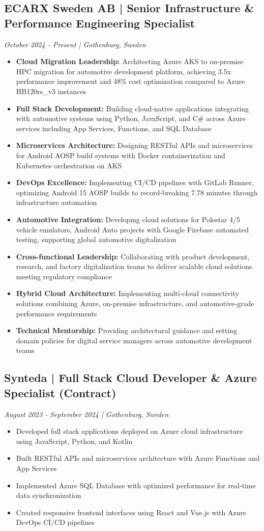 \documentclass[11pt,a4paper]{article}
\begin{document}
\subsection*{ECARX Sweden AB | Senior Infrastructure \& Performance Engineering Specialist}
\textit{October 2024 - Present | Gothenburg, Sweden}
\begin{itemize}[noitemsep]
\item \textbf{Cloud Migration Leadership:} Architecting Azure AKS to on-premise HPC migration for automotive development platform, achieving 3.5x performance improvement and 48\% cost optimization compared to Azure HB120rs\_v3 instances
\item \textbf{Full Stack Development:} Building cloud-native applications integrating with automotive systems using Python, JavaScript, and C\# across Azure services including App Services, Functions, and SQL Database
\item \textbf{Microservices Architecture:} Designing RESTful APIs and microservices for Android AOSP build systems with Docker containerization and Kubernetes orchestration on AKS
\item \textbf{DevOps Excellence:} Implementing CI/CD pipelines with GitLab Runner, optimizing Android 15 AOSP builds to record-breaking 7.78 minutes through infrastructure automation
\item \textbf{Automotive Integration:} Developing cloud solutions for Polestar 4/5 vehicle emulators, Android Auto projects with Google Firebase automated testing, supporting global automotive digitalization
\item \textbf{Cross-functional Leadership:} Collaborating with product development, research, and factory digitalization teams to deliver scalable cloud solutions meeting regulatory compliance
\item \textbf{Hybrid Cloud Architecture:} Implementing multi-cloud connectivity solutions combining Azure, on-premise infrastructure, and automotive-grade performance requirements
\item \textbf{Technical Mentorship:} Providing architectural guidance and setting domain policies for digital service managers across automotive development teams
\end{itemize}

\subsection*{Synteda | Full Stack Cloud Developer \& Azure Specialist (Contract)}
\textit{August 2023 - September 2024 | Gothenburg, Sweden}
\begin{itemize}[noitemsep]
\item Developed full stack applications deployed on Azure cloud infrastructure using JavaScript, Python, and Kotlin
\item Built RESTful APIs and microservices architecture with Azure Functions and App Services
\item Implemented Azure SQL Database with optimized performance for real-time data synchronization
\item Created responsive frontend interfaces using React and Vue.js with Azure DevOps CI/CD pipelines
\end{itemize}
\end{document}
